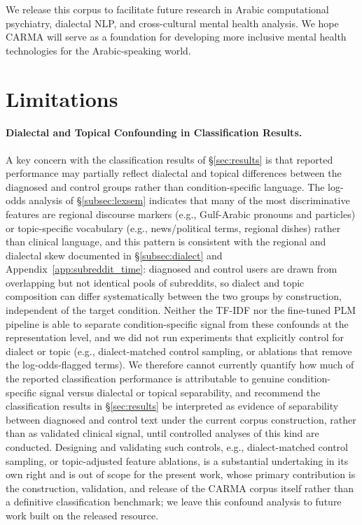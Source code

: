 \documentclass[11pt]{article}
\begin{document}
We release this corpus to facilitate future research in Arabic computational psychiatry, dialectal NLP, and cross-cultural mental health analysis. We hope CARMA will serve as a foundation for developing more inclusive mental health technologies for the Arabic-speaking world.




\section*{Limitations}
\paragraph{Dialectal and Topical Confounding in Classification Results.}
A key concern with the classification results of §\ref{sec:results} is that reported performance may partially reflect dialectal and topical differences between the diagnosed and control groups rather than condition-specific language. The log-odds analysis of §\ref{subsec:lexsem} indicates that many of the most discriminative features are regional discourse markers (e.g., Gulf-Arabic pronouns and particles) or topic-specific vocabulary (e.g., news/political terms, regional dishes) rather than clinical language, and this pattern is consistent with the regional and dialectal skew documented in §\ref{subsec:dialect} and Appendix~\ref{app:subreddit_time}: diagnosed and control users are drawn from overlapping but not identical pools of subreddits, so dialect and topic composition can differ systematically between the two groups by construction, independent of the target condition. Neither the TF-IDF nor the fine-tuned PLM pipeline is able to separate condition-specific signal from these confounds at the representation level, and we did not run experiments that explicitly control for dialect or topic (e.g., dialect-matched control sampling, or ablations that remove the log-odds-flagged terms). We therefore cannot currently quantify how much of the reported classification performance is attributable to genuine condition-specific signal versus dialectal or topical separability, and recommend the classification results in §\ref{sec:results} be interpreted as evidence of separability between diagnosed and control text under the current corpus construction, rather than as validated clinical signal, until controlled analyses of this kind are conducted. Designing and validating such controls, e.g., dialect-matched control sampling, or topic-adjusted feature ablations, is a substantial undertaking in its own right and is out of scope for the present work, whose primary contribution is the construction, validation, and release of the CARMA corpus itself rather than a definitive classification benchmark; we leave this confound analysis to future work built on the released resource.
\end{document}
